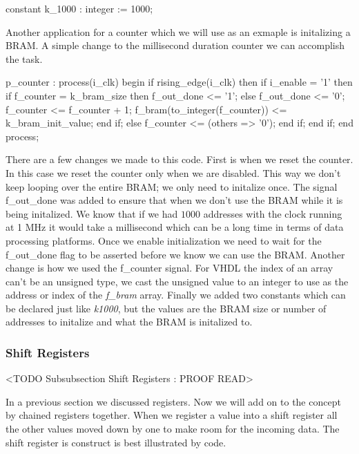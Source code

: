 \begin{VHDLlisting}[tabsize=4]
constant k\_1000 : integer := 1000;
\end{VHDLlisting}

Another application for a counter which we will use as an exmaple is initalizing a \ac{BRAM}. A simple change to the millisecond duration counter we can accomplish the task.

\begin{VHDLlisting}[tabsize=4]
p\_counter : process(i\_clk) 
begin
	if rising\_edge(i\_clk) then
		if i\_enable = '1' then
			if f\_counter = k\_bram\_size then
				f\_out\_done <= '1';
			else
				f\_out\_done <= '0';
				f\_counter <= f\_counter + 1;
				f\_bram(to\_integer(f\_counter)) <= k\_bram\_init\_value;
			end if;
		else	
			f\_counter <= (others => '0');
		end if;
	end if;
end process;
\end{VHDLlisting}

There are a few changes we made to this code. First is when we reset the counter. In this case we reset the counter only when we are disabled. This way we don't keep looping over the entire \ac{BRAM}; we only need to initalize once. The signal f\_out\_done was added to ensure that when we don't use the \ac{BRAM} while it is being initalized. We know that if we had $1000$ addresses with the clock running at 1 \ac{MHz} it would take a millisecond which can be a long time in terms of data processing platforms. Once we enable initialization we need to wait for the f\_out\_done flag to be asserted before we know we can use the \ac{BRAM}. Another change is how we used the f\_counter signal. For \ac{VHDL} the index of an array can't be an unsigned type, we cast the unsigned value to an integer to use as the address or index of the \emph{f\_bram} array. Finally we added two constants which can be declared just like \emph{k1000}, but the values are the \ac{BRAM} size or number of addresses to initalize and what the \ac{BRAM} is initalized to. 


\subsubsection{Shift Registers}
	<TODO Subsubsection  Shift Registers : PROOF READ>

In a previous section we discussed registers. Now we will add on to the concept by chained registers together. When we register a value into a shift register all the other values moved down by one to make room for the incoming data. The shift register is construct is best illustrated by code. 

